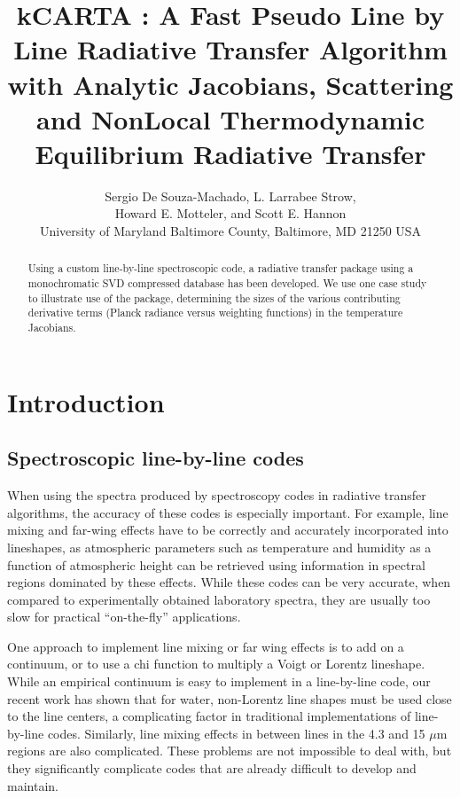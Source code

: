 \documentclass[11pt]{article}
\title{kCARTA : A Fast Pseudo Line by Line Radiative Transfer Algorithm with
                Analytic Jacobians, Scattering and NonLocal Thermodynamic 
                Equilibrium Radiative Transfer}
\author{Sergio De Souza-Machado, L. Larrabee Strow,\\
       Howard E. Motteler, and Scott E. Hannon\\
       University of Maryland Baltimore County, Baltimore, MD 21250 USA}
\begin{document}
\maketitle

\begin{abstract}
  
  Using a custom line-by-line spectroscopic code, a radiative transfer package
  using a monochromatic \textsf{SVD} compressed database has been developed. 
  We use one case study to illustrate use of the package, determining the 
  sizes of the various contributing derivative terms (Planck radiance versus 
  weighting functions) in the temperature Jacobians. 
\end{abstract}

\section{Introduction}

\subsection{Spectroscopic line-by-line codes}

When using the spectra produced by spectroscopy codes in radiative transfer
algorithms, the accuracy of these codes is especially important.
For example, line mixing and far-wing effects have to be correctly and
accurately incorporated into lineshapes, as atmospheric parameters 
such as temperature and humidity as a function of atmospheric height can be
retrieved using information in spectral regions dominated by these effects. 
While these codes can be very accurate, when compared to experimentally 
obtained laboratory spectra, they are usually too slow for practical 
``on-the-fly'' applications.

One approach to implement line mixing or far wing effects is to add on a 
continuum, or to use a chi function to  multiply a Voigt or Lorentz 
lineshape. While an empirical continuum is easy to implement in a 
line-by-line code, our recent
work has shown that for water, non-Lorentz line shapes must be used
close to the line centers, a complicating factor in traditional
implementations of line-by-line codes. Similarly, line mixing effects
in between \cd lines in the 4.3 and 15 $\mu$m regions are also complicated.
These problems are not impossible to deal with, but they significantly 
complicate codes that are already difficult to develop and maintain.
\end{document}
